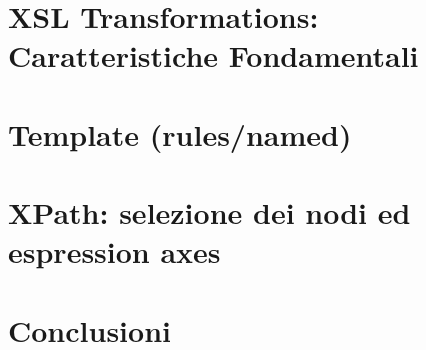 \documentclass{beamer}
\begin{document}
    
    \section{XSL Transformations: Caratteristiche Fondamentali}
    
    
    \section{Template (rules/named)}
    
    
    \section{XPath: selezione dei nodi ed espression axes}
    
    
    
    \section{Conclusioni}
    
    
    
\end{document}
